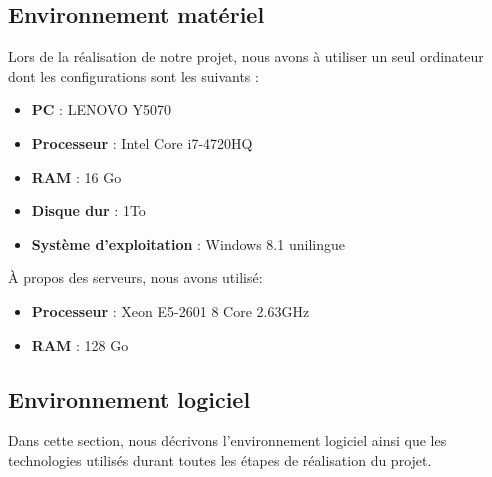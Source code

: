 \subsection[Environnement matériel]{Environnement matériel}
Lors de la réalisation de notre projet, nous avons à utiliser un seul ordinateur dont les configurations sont les suivants :
\begin{itemize}
	\item \textbf{PC} : LENOVO Y5070
	\item \textbf{Processeur} : Intel Core i7-4720HQ
	\item \textbf{RAM} : 16 Go
	\item \textbf{Disque dur} : 1To
	\item \textbf{Système d’exploitation} : Windows 8.1 unilingue
\end{itemize} 
À propos des serveurs, nous avons utilisé:
\begin{itemize}
    \item \textbf{Processeur} : Xeon E5-2601 8 Core 2.63GHz
    \item \textbf{RAM} : 128 Go
\end{itemize}

\subsection{Environnement logiciel }

Dans cette section, nous décrivons l'environnement logiciel ainsi que les technologies utilisés durant toutes les étapes de réalisation du projet.
